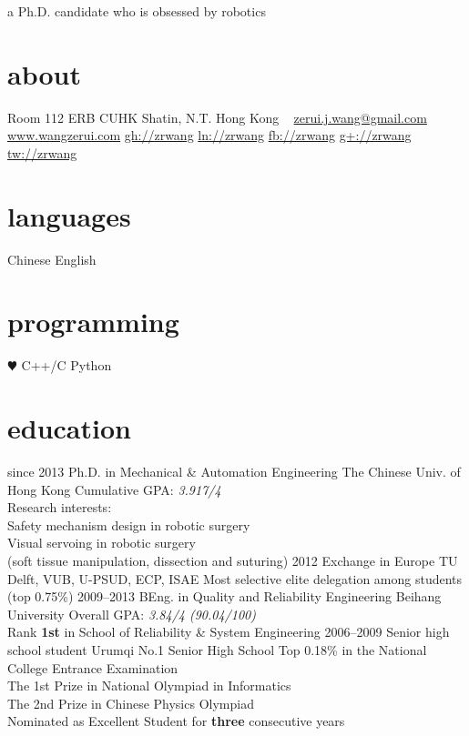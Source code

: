 \documentclass[]{friggeri-cv}
\begin{document}
       {a Ph.D. candidate who is obsessed by robotics}


\begin{aside}
  \section{about}
    Room 112
    ERB
    CUHK
    Shatin, N.T.
    Hong Kong
    ~
    \href{mailto:zerui.j.wang@gmail.com}{zerui.j.wang@gmail.com}
    \href{http://www.wangzerui.com}{www.wangzerui.com}
    \href{https://github.com/zrwang}{gh://zrwang}
    \href{https://www.linkedin.com/in/zrwang}{ln://zrwang}
    \href{https://www.facebook.com/zrwang.cuhk}{fb://zrwang}
    \href{https://plus.google.com/u/0/115306810481973645007/posts}{g+://zrwang}
    \href{https://twitter.com/wangzerui}{tw://zrwang}
  \section{languages}
    Chinese
    English
  \section{programming}
    {\color{red} $\varheartsuit$} C++/C
    Python
\end{aside}

\section{education}
\begin{entrylist}
  \entry
    {since 2013}
    {Ph.D. {\normalfont in Mechanical \& Automation Engineering}}
    {The Chinese Univ. of Hong Kong}
    {Cumulative GPA: \emph{3.917/4} \\
     Research interests: \\
     Safety mechanism design in robotic surgery \\
     Visual servoing in robotic surgery \\
     (soft tissue manipulation, dissection and suturing)}
  \entry
    {2012}
    {Exchange {\normalfont in Europe}}
    {TU Delft, VUB, U-PSUD, ECP, ISAE}
    {Most selective elite delegation among students (top 0.75\%)}
  \entry
    {2009–2013}
    {BEng. {\normalfont in Quality and Reliability Engineering}}
    {Beihang University}
    {Overall GPA: \emph{3.84/4 (90.04/100)} \\
     Rank \textbf{1st} in School of Reliability \& System Engineering}
  \entry
    {2006–2009}
    {Senior high school student}
    {Urumqi No.1 Senior High School}
    {Top 0.18\%  in the National College Entrance Examination \\
    The 1st Prize in National Olympiad in Informatics \\
    The 2nd Prize in Chinese Physics Olympiad \\
    Nominated as Excellent Student for \textbf{three} consecutive years}
\end{entrylist}
\end{document}
